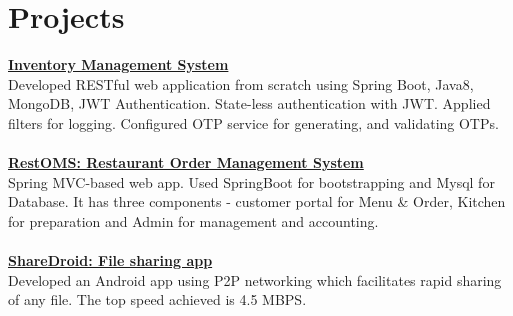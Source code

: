 \documentclass[a4paper,10.5pt]{article}
\begin{document}

\section{Projects}
\href{https://github.com/yashnmodi/Inventory_Management}{\textbf{Inventory Management System}} \\
Developed RESTful web application from scratch using Spring Boot, Java8, MongoDB, JWT Authentication. State-less authentication with JWT. Applied filters for logging. Configured OTP service for generating, and validating OTPs. \\ \\
\href{https://github.com/yashnmodi/RestOMS}{\textbf{RestOMS: Restaurant Order Management System}} \\
Spring MVC-based web app. Used SpringBoot for bootstrapping and Mysql for Database. It has three components - customer portal for Menu \& Order, Kitchen for preparation and Admin for management and accounting. \\ \\
\href{https://github.com/yashnmodi/ShareDroid}{\textbf{ShareDroid: File sharing app}} \\
Developed an Android app using P2P networking which facilitates rapid sharing of any file. The top speed achieved is 4.5 MBPS.
\end{document}
